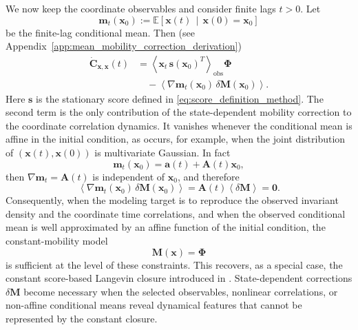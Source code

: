 \documentclass[11pt,twoside,fleqn]{article}
\begin{document}
We now keep the coordinate observables and consider finite lags $t>0$. Let
\begin{equation}
    \bm{m}_t(\bm{x}_0)
    :=
    \mathbb{E}
    \left[
        \bm{x}(t)
        \,\middle|\,
        \bm{x}(0)=\bm{x}_0
    \right]
    \label{eq:conditional_mean_method}
\end{equation}
be the finite-lag conditional mean. Then (see Appendix~\ref{app:mean_mobility_correction_derivation})
\begin{equation}
\begin{aligned}
    \dot{\bm{C}}_{\bm{x},\bm{x}}(t)
    &=
    \left\langle
        \bm{x}_t\,
        \bm{s}(\bm{x}_0)^T
    \right\rangle_{\mathrm{obs}}
    \bm{\Phi}
    \\
    &\quad-
    \left\langle
        \nabla\bm{m}_t(\bm{x}_0)\,
        \delta\bm{M}(\bm{x}_0)
    \right\rangle .
\end{aligned}
    \label{eq:coordinate_Cdot_mean_delta_method}
\end{equation}
Here \(\bm{s}\) is the stationary score defined in \eqref{eq:score_definition_method}. The second term is the only contribution of the state-dependent mobility correction to the coordinate correlation dynamics. It vanishes whenever the conditional mean is affine in the initial condition, as occurs, for example, when the joint distribution of $(\bm{x}(t),\bm{x}(0))$ is multivariate Gaussian. In fact
\begin{equation}
    \bm{m}_t(\bm{x}_0)
    =
    \bm{a}(t)
    +
    \bm{A}(t)\bm{x}_0,
    \label{eq:affine_conditional_mean_method}
\end{equation}
then $\nabla\bm{m}_t=\bm{A}(t)$ is independent of $\bm{x}_0$, and therefore
\begin{equation}
    \left\langle
        \nabla\bm{m}_t(\bm{x}_0)\,
        \delta\bm{M}(\bm{x}_0)
    \right\rangle
    =
    \bm{A}(t)
    \left\langle
        \delta\bm{M}
    \right\rangle
    =
    \bm{0}.
    \label{eq:deltaM_vanishes_affine_method}
\end{equation}
Consequently, when the modeling target is to reproduce the observed invariant density and the coordinate time correlations, and when the observed conditional mean is well approximated by an affine function of the initial condition, the constant-mobility model
\begin{equation}
    \bm{M}(\bm{x})
    =
    \bm{\Phi}
    \label{eq:constant_mobility_closure_method}
\end{equation}
is sufficient at the level of these constraints. This recovers, as a special case, the constant score-based Langevin closure introduced in \cite{giorgini2026scorelangevin}. State-dependent corrections $\delta\bm{M}$ become necessary when the selected observables, nonlinear correlations, or non-affine conditional means reveal dynamical features that cannot be represented by the constant closure.
\end{document}
